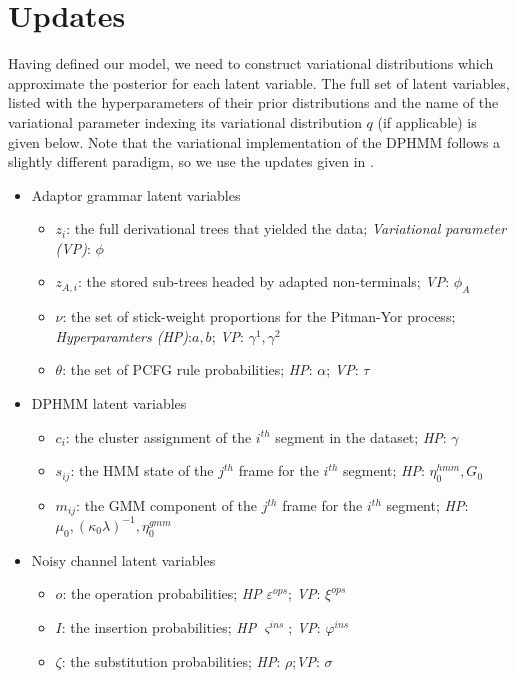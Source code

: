 \documentclass[12pt,letterpaper]{article}
\begin{document}
\section{Updates}
Having defined our model, we need to construct variational distributions which approximate the posterior for each latent variable. The full set of latent variables, listed with the hyperparameters of their prior distributions and the name of the variational parameter indexing its variational distribution $q$ (if applicable) is given below. Note that the variational implementation of the DPHMM follows a slightly different paradigm, so we use the updates given in \citet{ondel:2016}. 
\begin{itemize}
    \item Adaptor grammar latent variables
    \begin{itemize}
        \item $z_i$: the full derivational trees that yielded the data; \textit{Variational parameter (VP)}: $\phi $
        \item $z_{A,i}$: the stored sub-trees headed by adapted non-terminals; \textit{VP}: $\phi_A$
        \item $\nu$: the set of stick-weight proportions for the Pitman-Yor process; 
        \textit{Hyperparamters (HP)}:$a,b$; \textit{VP}: $\gamma^1, \gamma^2$
        \item $\theta$: the set of PCFG rule probabilities; \textit{HP}: $\alpha$; \textit{VP}: $\tau$ 
    \end{itemize}
    \item DPHMM latent variables
    \begin{itemize}
        \item $c_i$: the cluster assignment of the $i^{th}$ segment in the dataset; \textit{HP}: $\gamma$
        \item $s_{ij}$: the HMM state of the $j^{th}$ frame for the $i^{th}$ segment; \textit{HP}: $\eta_0^{hmm}, G_0$ 
        \item $m_{ij}$: the GMM component of the $j^{th}$ frame for the $i^{th}$ segment; \textit{HP}: $\mu_0, (\kappa_0\lambda)^{-1}, \eta_0^{gmm}$
    \end{itemize}
    \item Noisy channel latent variables
    \begin{itemize}
        \item $o$: the operation probabilities; \textit{HP} $\varepsilon^{ops}$; \textit{VP}: $\xi^{ops}$
        \item $I$: the insertion probabilities; \textit{HP} $\varsigma^{ins}$; \textit{VP}: $\varphi^{ins}$
        \item $\zeta$: the substitution probabilities; \textit{HP}: $\rho $;\textit{VP}: $\sigma$
    \end{itemize}
\end{itemize}
\end{document}
